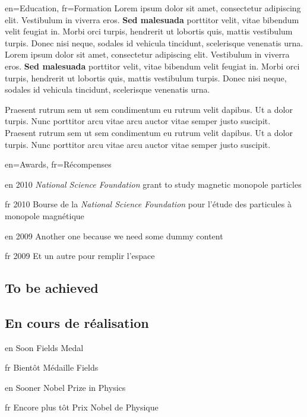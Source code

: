 \documentclass[letter]{article}
\begin{document}
\begin{section}{en={Education}, 
              fr={Formation}}
        {Lorem ipsum dolor sit amet, consectetur adipiscing elit. Vestibulum in viverra eros. \textbf{Sed malesuada} porttitor velit, vitae bibendum velit feugiat in. Morbi orci turpis, hendrerit ut lobortis quis, mattis vestibulum turpis. Donec nisi neque, sodales id vehicula tincidunt, scelerisque venenatis urna.}
        {Lorem ipsum dolor sit amet, consectetur adipiscing elit. Vestibulum in viverra eros. \textbf{Sed malesuada} porttitor velit, vitae bibendum velit feugiat in. Morbi orci turpis, hendrerit ut lobortis quis, mattis vestibulum turpis. Donec nisi neque, sodales id vehicula tincidunt, scelerisque venenatis urna.}

        {Praesent rutrum sem ut sem condimentum eu rutrum velit dapibus. Ut a dolor turpis. \newline
         Nunc porttitor arcu vitae arcu auctor vitae semper justo suscipit.}
        {Praesent rutrum sem ut sem condimentum eu rutrum velit dapibus. Ut a dolor turpis. \newline
         Nunc porttitor arcu vitae arcu auctor vitae semper justo suscipit.}
\end{section}

\begin{section}{en={Awards}, 
              fr={R\'ecompenses}}
    \item[en]{2010} {\textit{National Science Foundation} grant to study magnetic monopole particles}
    \item[fr]{2010} {Bourse de la \textit{National Science Foundation} pour l'étude des particules à monopole magnétique}

    \item[en]{2009} {Another one because we need some dummy content}
    \item[fr]{2009} {Et un autre pour remplir l'espace}

\subsection[en]{To be achieved}
\subsection[fr]{En cours de réalisation}
    \item[en]{Soon}     {Fields Medal}
    \item[fr]{Bientôt}  {Médaille Fields}
    \item[en]{Sooner}           {Nobel Prize in Physics}
    \item[fr]{Encore plus tôt}  {Prix Nobel de Physique}
\end{section}
\end{document}
